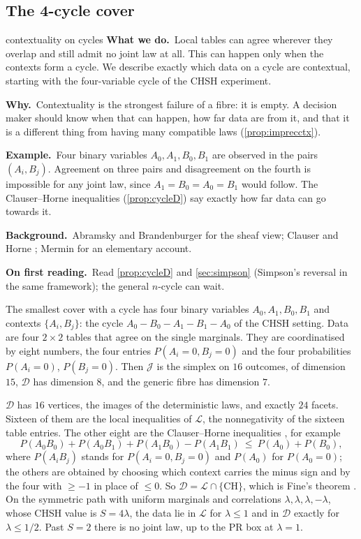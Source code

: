 \documentclass[11pt]{article}
\theoremstyle{definition}\newtheorem{definition}[theorem]{Definition}\newtheorem{remark}[theorem]{Remark}\newtheorem{example}[theorem]{Example}\newtheorem{problem}[theorem]{Open problem}\crefname{problem}{Problem}{Problems}
\newcommand{\rbwhat}{\textcolor{rbWhat}{\textbf{What we do.}}~}\newcommand{\rbwhy}{\par\smallskip\textcolor{rbWhy}{\textbf{Why.}}~}
\newcommand{\rbex}{\par\smallskip\textcolor{rbEx}{\textbf{Example.}}~}\newcommand{\rbbg}{\par\smallskip\textcolor{rbBg}{\textbf{Background.}}~}
\newcommand{\rbfirst}{\par\smallskip\textcolor{rbFirst}{\textbf{On first reading.}}~}
\begin{document}
\subsection{The 4-cycle cover}\label{sec:cycle}
\begin{readerbox}{contextuality on cycles}
\rbwhat Local tables can agree wherever they overlap and still admit no joint law at all. This can happen only when the contexts form a cycle. We describe exactly which data on a cycle are contextual, starting with the four-variable cycle of the CHSH experiment.
\rbwhy Contextuality is the strongest failure of a fibre: it is empty. A decision maker should know when that can happen, how far data are from it, and that it is a different thing from having many compatible laws (\cref{prop:imprecctx}).
\rbex Four binary variables $A_0,A_1,B_0,B_1$ are observed in the pairs $(A_i,B_j)$. Agreement on three pairs and disagreement on the fourth is impossible for any joint law, since $A_1=B_0=A_0=B_1$ would follow. The Clauser--Horne inequalities (\cref{prop:cycleD}) say exactly how far data can go towards it.
\rbbg Abramsky and Brandenburger \cite{AbramskyBrandenburger2011} for the sheaf view; Clauser and Horne \cite{ClauserHorne1974}; Mermin \cite{Mermin1990} for an elementary account.
\rbfirst Read \cref{prop:cycleD} and \cref{sec:simpson} (Simpson's reversal in the same framework); the general $n$-cycle can wait.
\end{readerbox}
The smallest cover with a cycle has four binary variables $A_0,A_1,B_0,B_1$ and contexts $\{A_i,B_j\}$: the cycle $A_0-B_0-A_1-B_1-A_0$ of the CHSH setting. Data are four $2\times2$ tables that agree on the single marginals. They are coordinatised by eight numbers, the four entries $P(A_i=0,B_j=0)$ and the four probabilities $P(A_i=0)$, $P(B_j=0)$. Then $\mathcal J$ is the simplex on $16$ outcomes, of dimension $15$, $\mathcal D$ has dimension $8$, and the generic fibre has dimension $7$.

\begin{proposition}\label{prop:cycleD}
$\mathcal D$ has $16$ vertices, the images of the deterministic laws, and exactly $24$ facets. Sixteen of them are the local inequalities of $\mathcal L$, the nonnegativity of the sixteen table entries. The other eight are the Clauser--Horne inequalities \cite{ClauserHorne1974}, for example
\[
P(A_0B_0)+P(A_0B_1)+P(A_1B_0)-P(A_1B_1)\ \le\ P(A_0)+P(B_0),
\]
where $P(A_iB_j)$ stands for $P(A_i=0,B_j=0)$ and $P(A_0)$ for $P(A_0=0)$; the others are obtained by choosing which context carries the minus sign and by the four with $\ge -1$ in place of $\le 0$. So $\mathcal D=\mathcal L\cap\{\mathrm{CH}\}$, which is Fine's theorem \cite{Fine1982}. On the symmetric path with uniform marginals and correlations $\lambda,\lambda,\lambda,-\lambda$, whose CHSH value is $S=4\lambda$, the data lie in $\mathcal L$ for $\lambda\le1$ and in $\mathcal D$ exactly for $\lambda\le1/2$. Past $S=2$ there is no joint law, up to the PR box at $\lambda=1$.
\end{proposition}
\end{document}
